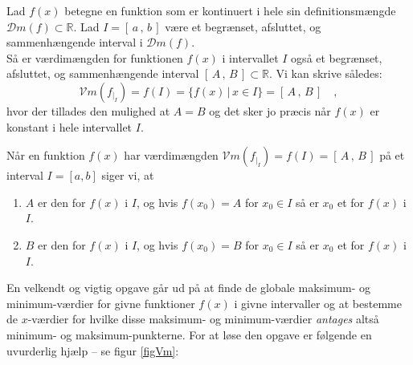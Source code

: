 \begin{theorem} \label{thmHovedsaetnKontEn}
Lad $f(x)$ betegne en funktion som er kontinuert i hele sin definitionsmængde $\mathcal{D}m(f) \subset \mathbb{R}$.
Lad $I = [\, a \, , \, b \, ]$ være et begrænset, afsluttet, og sammenhængende interval i $\mathcal{D}m(f)$. \\

Så er værdimængden for funktionen $f(x)$ i intervallet $I$ også et
begrænset, afsluttet, og sammenhængende interval $[\, A \, , \, B \, ] \subset \mathbb{R}$. Vi kan skrive således:
\begin{equation}
\mathcal{V}m(f_{|_{I}}) = f(I) = \{ f(x)\, | \, x\in I \} =  [\, A \, , \, B \, ] \quad ,
\end{equation}
hvor der tillades den mulighed at $A = B$ og det sker jo præcis når $f(x)$ er konstant i hele intervallet $I$.
\end{theorem}

\begin{definition} 
Når en funktion $f(x)$ har værdimængden $\mathcal{V}m(f_{|_{I}}) = f(I) = [\, A \, , \, B \, ]$ på et interval $I = [a, b]$ siger vi, at
\begin{enumerate}
\item $A$ er den  for $f(x)$ i $I$, og hvis $f(x_{0})= A$ for $x_{0} \in I$ så er $x_{0}$ et  for $f(x)$ i $I$.
\item $B$ er den  for $f(x)$ i $I$, og hvis $f(x_{0})= B$ for $x_{0} \in I$ så er $x_{0}$ et  for $f(x)$ i $I$.
\end{enumerate}
\end{definition}

En velkendt og vigtig opgave går ud på at finde de globale maksimum- og minimum-værdier for givne funktioner $f(x)$ i givne intervaller og at bestemme de $x$-værdier for hvilke
disse maksimum- og minimum-værdier {\emph{antages}} altså minimum- og maksimum-punkterne. For at løse den opgave er følgende en uvurderlig hjælp -- se figur \ref{figVm}:

